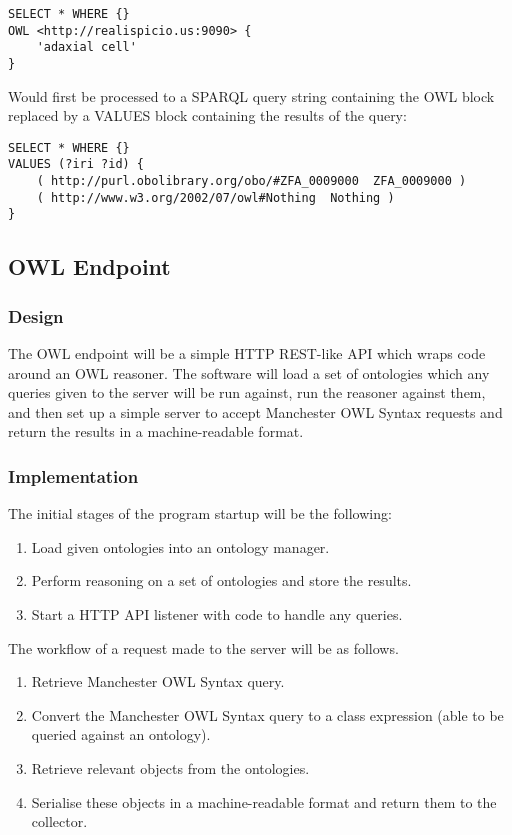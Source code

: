 \documentclass{article}
\begin{document}
\begin{lstlisting}
SELECT * WHERE {}
OWL <http://realispicio.us:9090> {
    'adaxial cell'
}
\end{lstlisting}

Would first be processed to a SPARQL query string containing the OWL block
replaced by a VALUES block containing the results of the query:

\begin{lstlisting}
SELECT * WHERE {} 
VALUES (?iri ?id) { 
    ( http://purl.obolibrary.org/obo/#ZFA_0009000  ZFA_0009000 ) 
    ( http://www.w3.org/2002/07/owl#Nothing  Nothing )
}
\end{lstlisting}

\subsection{OWL Endpoint}

\subsubsection{Design}

The OWL endpoint will be a simple HTTP REST-like API which wraps code around an
OWL reasoner. The software will load a set of ontologies which any queries given
to the server will be run against, run the reasoner against them, and then set
up a simple server to accept Manchester OWL Syntax requests and return the
results in a machine-readable format.

\subsubsection{Implementation}

The initial stages of the program startup will be the following:

\begin{enumerate}
    \item Load given ontologies into an ontology manager. 
    \item Perform reasoning on a set of ontologies and store the results.
    \item Start a HTTP API listener with code to handle any queries.
\end{enumerate}

The workflow of a request made to the server will be as follows. 

\begin{enumerate}
    \item Retrieve Manchester OWL Syntax query.
    \item Convert the Manchester OWL Syntax query to a class expression (able to
    be queried against an ontology).
    \item Retrieve relevant objects from the ontologies.
    \item Serialise these objects in a machine-readable format and return them 
    to the collector.
\end{enumerate}
\end{document}
